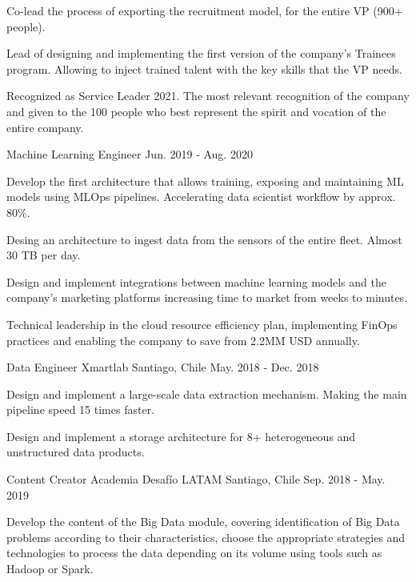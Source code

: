 \begin{cventries}
{\begin{cvitems}
        \item {Co-lead the process of exporting the recruitment model, for the entire VP (900+ people).}
        \item {Lead of designing and implementing the first version of the company's Trainees program. Allowing to inject trained talent with the key skills that the VP needs.}
      	\item {Recognized as Service Leader 2021. The most relevant recognition of the company and given to the 100 people who best represent the spirit and vocation of the entire company.}
      \end{cvitems}
    }

  \cventry
    {Machine Learning Engineer} %
    {} %
    {} %
    {Jun. 2019 - Aug. 2020} %
    {
    \begin{cvitems} %
      \item {Develop the first architecture that allows training, exposing and maintaining ML models using MLOps pipelines. Accelerating data scientist workflow by approx. 80\%.}
      \item {Desing an architecture to ingest data from the sensors of the entire fleet. Almost 30 TB per day.}
      \item {Design and implement integrations between machine learning models and the company's marketing platforms increasing time to market from weeks to minutes.}
      \item {Technical leadership in the cloud resource efficiency plan, implementing FinOps practices and enabling the company to save from 2.2MM USD annually.}
    \end{cvitems}
    }

  \cventry
    {Data Engineer} %
    {Xmartlab} %
    {Santiago, Chile} %
    {May. 2018 - Dec. 2018} %
    {
      \begin{cvitems} %
        \item {Design and implement a large-scale data extraction mechanism. Making the main pipeline speed 15 times faster.}
        \item {Design and implement a storage architecture for 8+ heterogeneous and unstructured data products.}
      \end{cvitems}
    }

\cventry
  {Content Creator} %
  {Academia Desafío LATAM} %
  {Santiago, Chile} %
  {Sep. 2018 - May. 2019} %
  {
    \begin{cvitems} %
      \item {Develop the content of the Big Data module, covering identification of Big Data problems according to their characteristics, choose the appropriate strategies and technologies to process the data depending on its volume using tools such as Hadoop or Spark.}
    \end{cvitems}
  }


\end{cventries}
